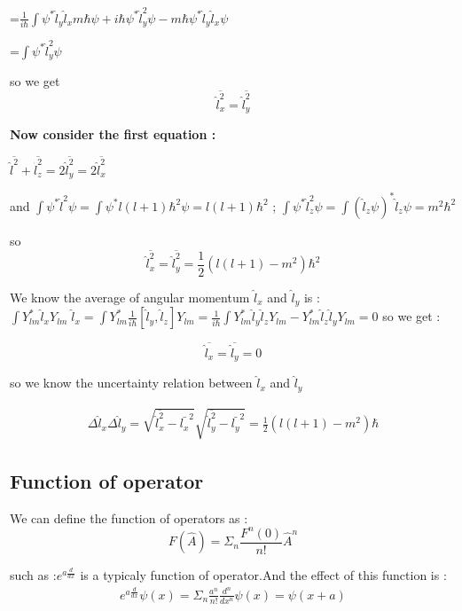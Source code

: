 \documentclass{article}
\begin{document}
=$\frac1{i\hbar}\int \psi^*\hat l_y\hat l_xm\hbar\psi+i\hbar\psi^*\hat l_y^2\psi-m\hbar\psi^*\hat l_y\hat l_x\psi$

=$\int \psi^*\hat l_y^2\psi$

so we get 
\begin{equation}
  \overline{\hat l_x^2}=\overline{\hat l_y^2}
\end{equation}

\textbf{Now consider the first equation :}

$\overline{\hat l^2}+\overline{\hat l_z^2}=2\overline{\hat l_y^2}=2\overline{\hat l_x^2}$

and $\int \psi^*\hat l^2\psi=\int \psi^*l(l+1)\hbar^2\psi=l(l+1)\hbar^2$ ; $\int \psi^*\hat l_z^2\psi=\int (\hat l_z\psi)^*\hat l_z\psi=m^2\hbar^2$

so \begin{equation}
  \overline{\hat l_x^2}=\overline{\hat l_y^2}=\frac12(l(l+1)-m^2)\hbar^2
  \end{equation}

  We know the average of angular momentum $\hat l_x$ and $\hat l_y$ is :
  $\int Y_{lm}^*\hat l_xY_{lm} \; \hat l_x=\int Y_{lm}^* \frac1{i\hbar}[\hat l_y,\hat l_z]Y_{lm}=\frac1{i\hbar}\int Y_{lm}^*\hat l_y\hat l_zY_{lm}-Y_{lm}^*\hat l_z\hat l_yY_{lm}=0$
so we get :

\begin{equation}
  \overline{\hat l_x}=\overline{\hat l_y}=0
\end{equation}

so we know the uncertainty relation between $\hat l_x$ and $\hat l_y$

\begin{align}
  \Delta{\hat l_x}\Delta{\hat l_y}=\sqrt{\overline{\hat l_x^2}-\bar {l_x}^2}\sqrt{\overline{\hat l_y^2}-\bar {l_y}^2}=\frac12(l(l+1)-m^2)\hbar
\end{align}

\subsection{Function of operator}

We can define the function of operators as :
\begin{equation}
  F(\hat A)=\Sigma_n\frac{F^n(0)}{n!}\hat A^n
\end{equation}

such as :$e^{a\frac{d}{dx}}$ is a typicaly function of operator.And the effect of this function is :
\begin{align}
  e^{a\frac{d}{dx}}\psi(x)=\Sigma_n\frac{a^n}{n!}\frac{d^n}{dx^n}\psi(x)=\psi(x+a)
  \end{align}
\end{document}
